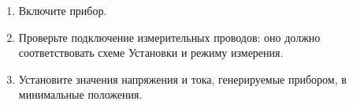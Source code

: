 \begin{enumerate}

\item Включите прибор.
\item Проверьте подключение измерительных проводов: оно должно соответствовать схеме Установки и режиму измерения.
\item Установите значения напряжения и тока, генерируемые прибором, в минимальные положения.

\end{enumerate}
